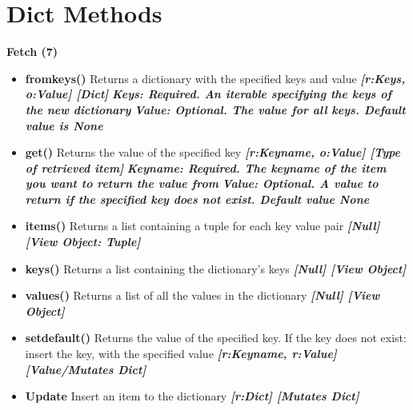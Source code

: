 \documentclass{report}
\begin{document}
    \pagebreak \bigbreak \noindent 
    \section{\LARGE Dict Methods}
    \bigbreak \noindent 
     
        \begin{center}
            \textbf{Fetch (7)}
        \end{center}
    \begin{itemize}
        \item[\ding{43}] \textbf{fromkeys()}	Returns a dictionary with the specified keys and value
            \smallbreak
            \textbf{\textit{[r:Keys, o:Value] [Dict]}}
            \smallbreak
            \textbf{\textit{Keys: 	Required. An iterable specifying the keys of the new dictionary}}
            \smallbreak
            \textbf{\textit{Value:	Optional. The value for all keys. Default value is None}}
            \smallbreak
        \item[\ding{43}] \textbf{get()}		Returns the value of the specified key
            \smallbreak
            \textbf{\textit{[r:Keyname, o:Value] [Type of retrieved item]}}
            \smallbreak
            \textbf{\textit{Keyname: 	Required. The keyname of the item you want to return the value from}}
            \smallbreak
            \textbf{\textit{Value: Optional. A value to return if the specified key does not exist. Default value None}}
            \smallbreak
        \item[\ding{43}] \textbf{items()}		Returns a list containing a tuple for each key value pair
            \smallbreak
            \textbf{\textit{[Null] [View Object: Tuple]}}
            \smallbreak \noindent
        \item[\ding{43}] \textbf{keys()}		Returns a list containing the dictionary's keys
            \smallbreak \noindent
            \textbf{\textit{[Null] [View Object]}}
            \smallbreak
        \item[\ding{43}] \textbf{values()}	Returns a list of all the values in the dictionary
            \smallbreak \noindent
            \textbf{\textit{[Null] [View Object]}}
            \smallbreak \noindent
        \item[\ding{43}] \textbf{setdefault()}	Returns the value of the specified key. If the key does not exist: insert the key, with the specified value
            \smallbreak \noindent
            \textbf{\textit{[r:Keyname, r:Value] [Value/Mutates Dict]}}
            \smallbreak \noindent
        \item[\ding{43}] \textbf{Update} Insert an item to the dictionary
            \smallbreak \noindent
            \textbf{\textit{[r:Dict] [Mutates Dict]}}
    \end{itemize}
    
\end{document}
